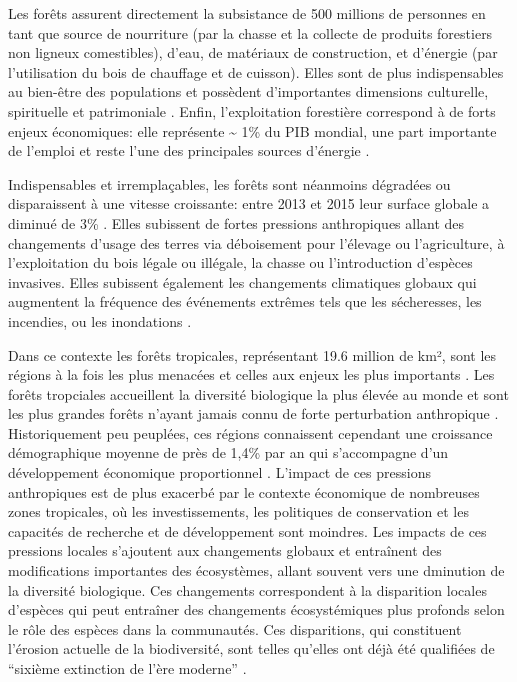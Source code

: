 \documentclass[
  11pt,
  french,
  A4paper,
  extrafontsizes,onecolumn,openright
  ]{memoir}
\begin{document}
Les forêts assurent directement la subsistance de 500 millions de
personnes en tant que source de nourriture (par la chasse et la collecte
de produits forestiers non ligneux comestibles), d'eau, de matériaux de
construction, et d'énergie (par l'utilisation du bois de chauffage et de
cuisson). Elles sont de plus indispensables au bien-être des populations
et possèdent d'importantes dimensions culturelle, spirituelle et
patrimoniale \autocites{FRA2015}{Tilman2014}. Enfin, l'exploitation
forestière correspond à de forts enjeux économiques: elle représente
\textasciitilde{} 1\% du PIB mondial, une part importante de l'emploi et
reste l'une des principales sources d'énergie
\autocites{CBDdiversity2011}{FAO2014}.

Indispensables et irremplaçables, les forêts sont néanmoins dégradées ou
disparaissent à une vitesse croissante: entre 2013 et 2015 leur surface
globale a diminué de 3\% \autocite{FAO2009}. Elles subissent de fortes
pressions anthropiques allant des changements d'usage des terres via
déboisement pour l'élevage ou l'agriculture, à l'exploitation du bois
légale ou illégale, la chasse ou l'introduction d'espèces invasives.
Elles subissent également les changements climatiques globaux qui
augmentent la fréquence des événements extrêmes tels que les
sécheresses, les incendies, ou les inondations
\autocite{Pachauri2014}.\newline

Dans ce contexte les forêts tropicales, représentant 19.6 million de
km², sont les régions à la fois les plus menacées et celles aux enjeux
les plus importants \autocite{Barlow2018}. Les forêts tropciales
accueillent la diversité biologique la plus élevée au monde et sont les
plus grandes forêts n'ayant jamais connu de forte perturbation
anthropique \autocites{Gentry1988}{FAO2011}. Historiquement peu
peuplées, ces régions connaissent cependant une croissance démographique
moyenne de près de 1,4\% par an qui s'accompagne d'un développement
économique proportionnel \autocite{Asner2009}. L'impact de ces pressions
anthropiques est de plus exacerbé par le contexte économique de
nombreuses zones tropicales, où les investissements, les politiques de
conservation et les capacités de recherche et de développement sont
moindres. Les impacts de ces pressions locales s'ajoutent aux
changements globaux et entraînent des modifications importantes des
écosystèmes, allant souvent vers une dminution de la diversité
biologique. Ces changements correspondent à la disparition locales
d'espèces qui peut entraîner des changements écosystémiques plus
profonds selon le rôle des espèces dans la communautés. Ces
disparitions, qui constituent l'érosion actuelle de la biodiversité,
sont telles qu'elles ont déjà été qualifiées de ``sixième extinction de
l'ère moderne'' \autocites{Vitousek1997}{Cardinale2012}.
\end{document}
